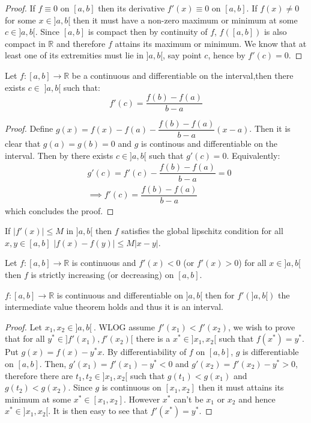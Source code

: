 \begin{proof}
    If \(f \equiv 0\) on \([a,b]\) then its derivative \(f'(x) \equiv 0\) on \([a,b]\). If \(f(x) \neq 0\) for some \(x \in ]a,b[\) then it must have a non-zero maximum or minimum at some \(c \in ]a,b[\). Since \([a,b]\) is compact then by continuity of \(f\), \(f([a,b])\) is also compact in \(\mathbb{R}\) and therefore \(f\) attains its maximum or minimum. We know that at least one of its extremities must lie in \(]a,b[\), say point \(c\), hence by  \(f'(c) = 0\).
\end{proof}
\begin{theorem}\label{MVT}
    Let \(f: [a,b] \to \mathbb{R}\) be a continuous and differentiable on the interval,then there exists \(c \in \; ]a,b[\) such that:
    \[f'(c) = \dfrac{f(b) - f(a)}{b - a}\]
\end{theorem}
\begin{proof}
    Define \(g(x) = f(x)  - f(a) - \dfrac{f(b) - f(a)}{b-a}(x-a)\). Then it is clear that \(g(a) = g(b) = 0\) and \(g\) is continous and differentiable on the interval. Then by  there exists \(c \in ]a,b[\) such that \(g'(c) = 0\). Equivalently:
    \begin{align*}
         & g'(c) = f'(c) -  \dfrac{f(b) - f(a)}{b-a} = 0 \\
         & \implies f'(c) =  \dfrac{f(b) - f(a)}{b-a}
    \end{align*}
    which concludes the proof.
\end{proof}
\begin{corollary}
    If \(|f'(x)| \leq M \) in \(]a,b[\) then \(f\) satisfies the global lipschitz condition for all \(x,y \in [a,b]\) \(|f(x) - f(y) | \leq M |x-y|  \).
\end{corollary}
\begin{corollary}
    Let \(f: [a,b] \to \mathbb{R}\) is continuous and \(f'(x) < 0\) (or \(f'(x) > 0\)) for all \(x \in ]a,b[\) then \(f\) is strictly increasing (or decreasing) on \([a,b]\).
\end{corollary}
\begin{theorem}
    \(f: [a,b] \to \mathbb{R}\) is continuous and differentiable on \(]a,b[\) then for \(f'(]a,b[)\) the intermediate value theorem holds and thus it is an interval.
\end{theorem}
\begin{proof}
    Let \(x_1, x_2 \in ]a,b[\ \). WLOG assume \(f'(x_1) < f'(x_2)\), we wish to prove that for all \(y^* \in ]f'(x_1), f'(x_2)[\) there is a \(x^* \in ]x_1,x_2[ \) such that \(f(x^*) = y^*\). Put \(g(x) = f(x) - y^*x\). By differentiability of \(f\) on \([a,b]\), \(g\) is differentiable on \([a,b]\). Then, \(g'(x_1) = f'(x_1) - y^* < 0\) and \(g'(x_2) =  f'(x_2) - y^* > 0\), therefore there are \(t_1,t_2 \in ]x_1,x_2[\) such that \(g(t_1) < g(x_1)\) and \(g(t_2) < g(x_2)\). Since \(g\) is continuous on \([x_1,x_2]\) then it must attains its minimum at some \(x^* \in [x_1,x_2]\). However \(x^* \) can't be \(x_1\) or \(x_2\) and hence \(x^* \in ]x_1,x_2[\). It is then easy to see that \(f'(x^*) = y^*\).
\end{proof}
